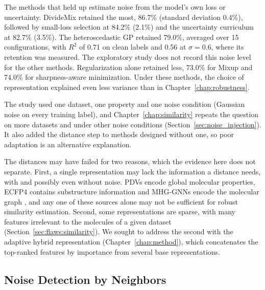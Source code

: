 The methods that held up estimate noise from the model's own loss or uncertainty. DivideMix \citep{li2020dividemix} retained the most, 86.7\% (standard deviation 0.4\%), followed by small-loss selection \citep{Han2018} at 84.2\% (2.1\%) and the uncertainty curriculum \citep{Bengio2009} at 82.7\% (3.5\%). The heteroscedastic GP \citep{liu2020} retained 79.0\%, averaged over 15 configurations, with $R^2$ of 0.71 on clean labels and 0.56 at $\sigma = 0.6$, where its retention was measured. The exploratory study does not record this noise level for the other methods. Regularization alone retained less, 73.0\% for Mixup and 74.0\% for sharpness-aware minimization. Under these methods, the choice of representation explained even less variance than in Chapter~\ref{chap:robustness}.

The study used one dataset, one property and one noise condition (Gaussian noise on every training label), and Chapter~\ref{chap:similarity} repeats the question on more datasets and under other noise conditions (Section~\ref{sec:noise_injection}). It also added the distance step to methods designed without one, so poor adaptation is an alternative explanation.

The distances may have failed for two reasons, which the evidence here does not separate. First, a single representation may lack the information a distance needs, with and possibly even without noise. PDVs encode global molecular properties, ECFP4 contains substructure information and MHG-GNNs encode the molecular graph \citep{kishimoto2023}, and any one of these sources alone may not be sufficient for robust similarity estimation. Second, some representations are sparse, with many features irrelevant to the molecules of a given dataset (Section~\ref{sec:flaws:similarity}). We sought to address the second with the adaptive hybrid representation (Chapter~\ref{chap:method}), which concatenates the top-ranked features by importance from several base representations.


\subsection{Noise Detection by Neighbors}\label{sec:flaws:neighbors} %

